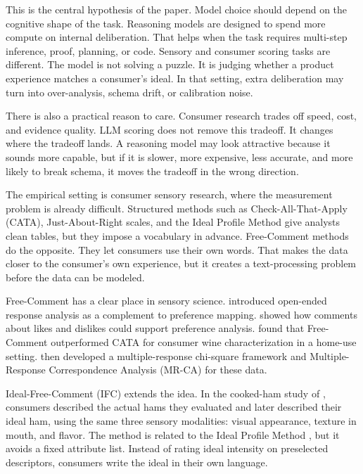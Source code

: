 \documentclass[12pt]{article}
\begin{document}
This is the central hypothesis of the paper. Model choice should depend on the cognitive shape of the task. Reasoning models are designed to spend more compute on internal deliberation. That helps when the task requires multi-step inference, proof, planning, or code. Sensory and consumer scoring tasks are different. The model is not solving a puzzle. It is judging whether a product experience matches a consumer's ideal. In that setting, extra deliberation may turn into over-analysis, schema drift, or calibration noise.

There is also a practical reason to care. Consumer research trades off speed, cost, and evidence quality. LLM scoring does not remove this tradeoff. It changes where the tradeoff lands. A reasoning model may look attractive because it sounds more capable, but if it is slower, more expensive, less accurate, and more likely to break schema, it moves the tradeoff in the wrong direction.

The empirical setting is consumer sensory research, where the measurement problem is already difficult. Structured methods such as Check-All-That-Apply (CATA), Just-About-Right scales, and the Ideal Profile Method give analysts clean tables, but they impose a vocabulary in advance. Free-Comment methods do the opposite. They let consumers use their own words. That makes the data closer to the consumer's own experience, but it creates a text-processing problem before the data can be modeled.

Free-Comment has a clear place in sensory science. \citet{tenkleij2003freecomment} introduced open-ended response analysis as a complement to preference mapping. \citet{symoneaux2012comments} showed how comments about likes and dislikes could support preference analysis. \citet{mahieu2020fcwine} found that Free-Comment outperformed CATA for consumer wine characterization in a home-use setting. \citet{mahieu2021mrca} then developed a multiple-response chi-square framework and Multiple-Response Correspondence Analysis (MR-CA) for these data.

Ideal-Free-Comment (IFC) extends the idea. In the cooked-ham study of \citet{mahieu2022ifc}, consumers described the actual hams they evaluated and later described their ideal ham, using the same three sensory modalities: visual appearance, texture in mouth, and flavor. The method is related to the Ideal Profile Method \citep{worch2013ipm}, but it avoids a fixed attribute list. Instead of rating ideal intensity on preselected descriptors, consumers write the ideal in their own language.
\end{document}
